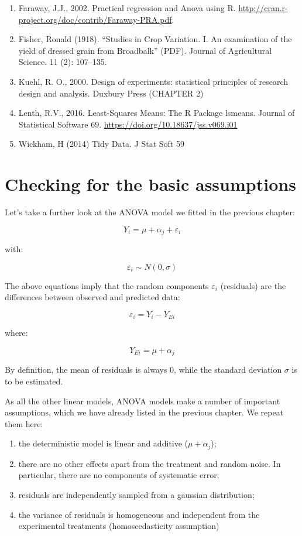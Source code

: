 \documentclass[a4paper,12pt,oneside]{book}
\providecommand{\tightlist}{%
  \setlength{\itemsep}{0pt}\setlength{\parskip}{0pt}}
\begin{document}
\begin{enumerate}
\def\labelenumi{\arabic{enumi}.}
\tightlist
\item
  Faraway, J.J., 2002. Practical regression and Anova using R. \url{http://cran.r-project.org/doc/contrib/Faraway-PRA.pdf}.
\item
  Fisher, Ronald (1918). ``Studies in Crop Variation. I. An examination of the yield of dressed grain from Broadbalk'' (PDF). Journal of Agricultural Science. 11 (2): 107--135.
\item
  Kuehl, R. O., 2000. Design of experiments: statistical principles of research design and analysis. Duxbury Press (CHAPTER 2)
\item
  Lenth, R.V., 2016. Least-Squares Means: The R Package lsmeans. Journal of Statistical Software 69. \url{https://doi.org/10.18637/jss.v069.i01}
\item
  Wickham, H (2014) Tidy Data. J Stat Soft 59
\end{enumerate}

\hypertarget{checking-for-the-basic-assumptions}{%
\chapter{Checking for the basic assumptions}\label{checking-for-the-basic-assumptions}}

Let's take a further look at the ANOVA model we fitted in the previous chapter:

\[Y_i = \mu + \alpha_j + \varepsilon_i\]

with:

\[ \varepsilon_i \sim N(0, \sigma) \]

The above equations imply that the random components \(\varepsilon_i\) (residuals) are the differences between observed and predicted data:

\[\varepsilon_i = Y_i - Y_{Ei}\]

where:

\[Y_{Ei} = \mu + \alpha_j\]

By definition, the mean of residuals is always 0, while the standard deviation \(\sigma\) is to be estimated.

As all the other linear models, ANOVA models make a number of important assumptions, which we have already listed in the previous chapter. We repeat them here:

\begin{enumerate}
\def\labelenumi{\arabic{enumi}.}
\tightlist
\item
  the deterministic model is linear and additive (\(\mu + \alpha_j\));
\item
  there are no other effects apart from the treatment and random noise. In particular, there are no components of systematic error;
\item
  residuals are independently sampled from a gaussian distribution;
\item
  the variance of residuals is homogeneous and independent from the experimental treatments (homoscedasticity assumption)
\end{enumerate}
\end{document}
